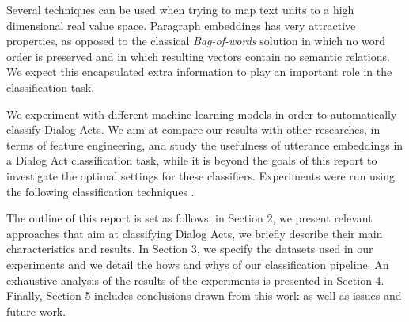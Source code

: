 Several techniques can be used when trying to map text units to a high dimensional real value space. Paragraph embeddings has very attractive properties, as opposed to the classical \emph{Bag-of-words} solution in which no word order is preserved and in which resulting vectors contain no semantic relations. We expect this encapsulated extra information to play an important role in the classification task.

We experiment with different machine learning models in order to automatically classify Dialog Acts. We aim at compare our results with other researches, in terms of feature engineering, and study the usefulness of utterance embeddings in a Dialog Act classification task, while it is beyond the goals of this report to investigate the optimal settings for these classifiers. Experiments were run using the following classification techniques .

The outline of this report is set as follows: in Section 2, we present relevant approaches that aim at classifying Dialog Acts, we briefly describe their main characteristics and results. In Section 3, we specify the datasets used in our experiments and we detail the hows and whys of our classification pipeline. An exhaustive analysis of the results of the experiments is presented in Section 4. Finally, Section 5 includes conclusions drawn from this work as well as issues and future work. 